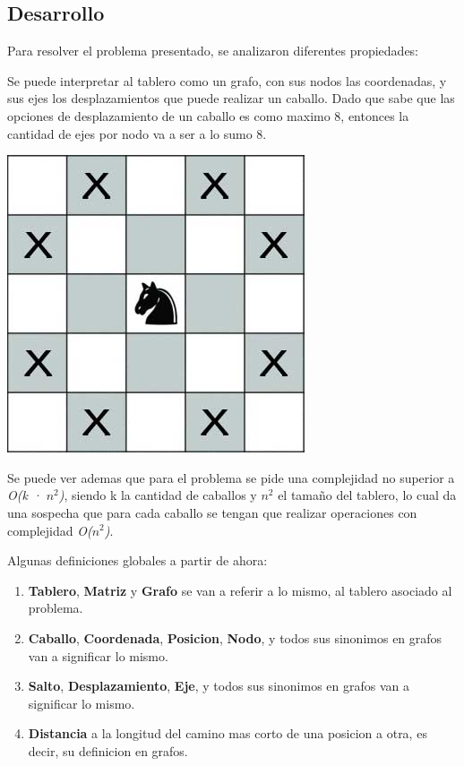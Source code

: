 \documentclass[10pt,a4paper]{article}
\begin{document}
\newpage
\subsection{Desarrollo}

Para resolver el problema presentado, se analizaron diferentes propiedades:

Se puede interpretar al tablero como un grafo, con sus nodos las coordenadas, y sus ejes los desplazamientos que puede realizar un caballo. Dado que sabe que las opciones de desplazamiento de un caballo es como maximo 8, entonces la cantidad de ejes por nodo va a ser a lo sumo 8.

\begin{center}
\includegraphics[scale=0.25]{img/knight.jpg}
\end{center}

Se puede ver ademas que para el problema se pide una complejidad no superior a \textit{O(k · $n^2$)}, siendo k la cantidad de caballos y $n^2$ el tamaño del tablero, lo cual da una sospecha que para cada caballo se tengan que realizar operaciones con complejidad \textit{O($n^2$)}.

\bigskip
Algunas definiciones globales a partir de ahora:
\begin{enumerate}
\item \textbf{Tablero}, \textbf{Matriz} y \textbf{Grafo} se van a referir a lo mismo, al tablero asociado al problema.
\item \textbf{Caballo}, \textbf{Coordenada}, \textbf{Posicion}, \textbf{Nodo}, y todos sus sinonimos en grafos van a significar lo mismo.
\item \textbf{Salto}, \textbf{Desplazamiento}, \textbf{Eje}, y todos sus sinonimos en grafos van a significar lo mismo.
\item \textbf{Distancia} a la longitud del camino mas corto de una posicion a otra, es decir, su definicion en grafos.
\end{enumerate}
\end{document}
